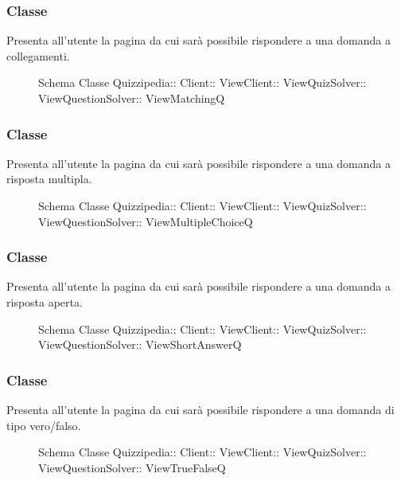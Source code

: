 \subsubsection{Classe }
Presenta all'utente la pagina da cui sarà possibile rispondere a una domanda a collegamenti.
\begin{figure}[H]
\centering
\noindent{}
\caption[Schema Classe ViewMatchingQ]{Schema Classe Quizzipedia:: Client:: ViewClient:: ViewQuizSolver:: ViewQuestionSolver:: ViewMatchingQ}
\end{figure}
\subsubsection{Classe }
Presenta all'utente la pagina da cui sarà possibile rispondere a una domanda a risposta multipla.
\begin{figure}[H]
\centering
\noindent{}
\caption[Schema Classe ViewMultipleChoiceQ]{Schema Classe Quizzipedia:: Client:: ViewClient:: ViewQuizSolver:: ViewQuestionSolver:: ViewMultipleChoiceQ}
\end{figure}
\subsubsection{Classe }
Presenta all'utente la pagina da cui sarà possibile rispondere a una domanda a risposta aperta.
\begin{figure}[H]
\centering
\noindent{}
\caption[Schema Classe ViewShortAnswerQ]{Schema Classe Quizzipedia:: Client:: ViewClient:: ViewQuizSolver:: ViewQuestionSolver:: ViewShortAnswerQ}
\end{figure}
\subsubsection{Classe }
Presenta all'utente la pagina da cui sarà possibile rispondere a una domanda di tipo vero/falso.
\begin{figure}[H]
\centering
\noindent{}
\caption[Schema Classe ViewTrueFalseQ]{Schema Classe Quizzipedia:: Client:: ViewClient:: ViewQuizSolver:: ViewQuestionSolver:: ViewTrueFalseQ}
\end{figure}
